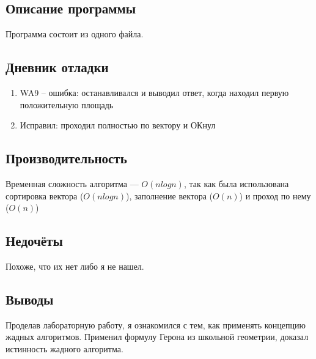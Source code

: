 \documentclass[12pt]{article}
\begin{document}
    \subsection*{Описание программы}

    Программа состоит из одного файла.

    \subsection*{Дневник отладки}

    \begin{enumerate}
    \item WA9 -- ошибка: останавливался и  выводил ответ, когда находил первую положительную площадь
    \item Исправил: проходил полностью по вектору и ОКнул
    \end{enumerate}


    \subsection*{Производительность}

    Временная сложность алгоритма — $O(nlogn)$, так как была использована сортировка вектора ($O(nlogn)$), заполнение вектора ($O(n)$) и проход по нему ($O(n)$)

    \subsection*{Недочёты}

    Похоже, что их нет либо я не нашел.

    \subsection*{Выводы}

    Проделав лабораторную работу, я ознакомился с тем, как применять концепцию жадных алгоритмов. Применил формулу Герона из школьной геометрии, доказал истинность жадного алгоритма.
\end{document}
